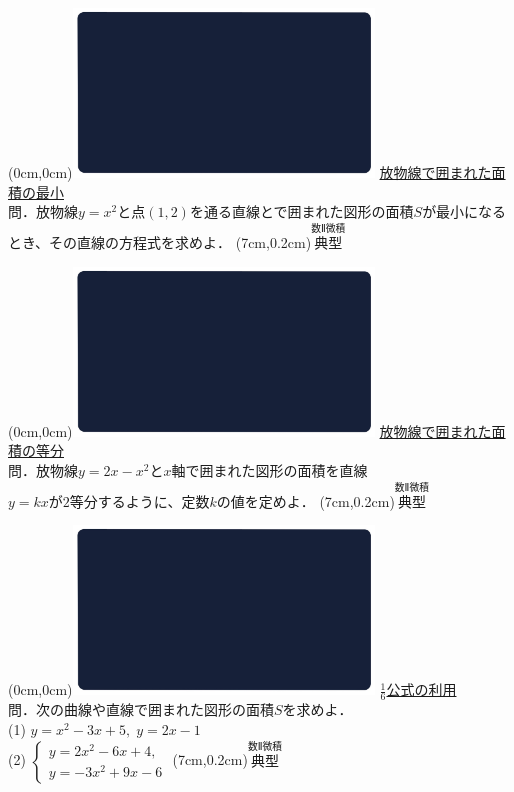 \documentclass[10pt,
fleqn,
dvipdfmx,
uplatex
]{jsarticle}
\begin{document}
\at(0cm,0cm){\includegraphics[width=8cm,bb=0 0 1920 1080]{./youtube/thumbnails/templates/smart_background/数II微積.jpeg}}
{\color{orange}\Large\underline{放物線で囲まれた面積の最小}}\vspace{0.3zw}\\
\Large
問．放物線$y=x^2$と点$\left(1,2\right)$を通る直線とで囲まれた図形の面積$S$が最小になるとき、その直線の方程式を求めよ．
\at(7cm,0.2cm){\small\color{bradorange}$\overset{\text{数Ⅱ微積}}{\text{典型}}$}

\newpage

\at(0cm,0cm){\includegraphics[width=8cm,bb=0 0 1920 1080]{./youtube/thumbnails/templates/smart_background/数II微積.jpeg}}
{\color{orange}\Large\underline{放物線で囲まれた面積の等分}}\vspace{0.3zw}\\
\Large 
問．放物線$y=2x-x^2$と$x$軸で囲まれた図形の面積を直線\\$y=kx$が$2$等分するように、定数$k$の値を定めよ．
\at(7cm,0.2cm){\small\color{bradorange}$\overset{\text{数Ⅱ微積}}{\text{典型}}$}

\newpage

\at(0cm,0cm){\includegraphics[width=8cm,bb=0 0 1920 1080]{./youtube/thumbnails/templates/smart_background/数II微積.jpeg}}
{\color{orange}\Large\underline{$\frac{1}{6}$公式の利用}}\vspace{0.3zw}\\
\large 
問．次の曲線や直線で囲まれた図形の面積$S$を求めよ．\\
(1)  $y=x^2-3x+5,\;y=2x-1$\\
(2)  $\left\{\begin{array}{l}y=2x^2-6x+4,\;\\y=-3x^2+9x-6\end{array}\right.$
\at(7cm,0.2cm){\small\color{bradorange}$\overset{\text{数Ⅱ微積}}{\text{典型}}$}
\end{document}
